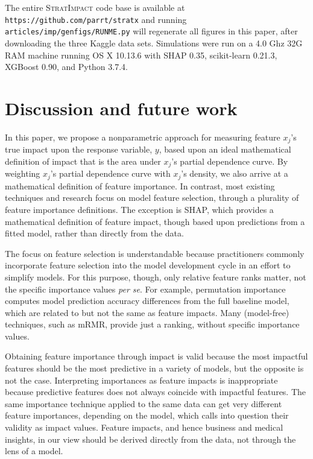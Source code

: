 \documentclass[11pt]{article}
\newcommand{\simp}{\fontfamily{cmr}\textsc{\small StratImpact}}
\begin{document}
The entire \simp{} code base is available at {\tt\small https://github.com/parrt/stratx} and running {\tt\small articles/imp/genfigs/RUNME.py} will regenerate all figures in this paper, after downloading the three Kaggle data sets.  Simulations were run on a 4.0 Ghz 32G RAM machine running OS X 10.13.6 with SHAP 0.35, scikit-learn                       0.21.3, XGBoost 0.90, and Python 3.7.4.

\section{Discussion and future work}\label{sec:discussion}

In this paper, we propose a nonparametric approach for measuring feature $x_j$'s true impact upon the response variable, $y$, based upon an ideal mathematical definition of impact that is the area under $x_j$'s partial dependence curve. By weighting $x_j$'s partial dependence curve with $x_j$'s density, we also arrive at a mathematical definition of feature importance.  In contrast, most existing techniques and research focus on model feature selection, through a plurality of feature importance definitions.   The exception is SHAP, which provides a mathematical definition of feature impact, though based upon predictions from a fitted model, rather than directly from the data.

The focus on feature selection is understandable because practitioners commonly incorporate feature selection into the model development cycle in an effort to simplify models. For this purpose, though, only relative feature ranks matter, not the specific importance values {\em per se}.  For example, permutation importance  computes model prediction accuracy differences from the full baseline model, which are related to but not the same as feature impacts. Many (model-free) techniques, such as mRMR, provide just a ranking, without specific importance values.

Obtaining feature importance through impact is valid because the most impactful features should be the most predictive in a variety of models, but the opposite is not the case.   Interpreting importances as feature impacts is inappropriate because predictive features does not always coincide with impactful features.  The same importance technique applied to the same data can get very different feature importances, depending on the model, which calls into question their validity as impact values.  Feature impacts, and hence business and medical insights,  in our view should be derived directly from the data, not through the lens of a model.
\end{document}
